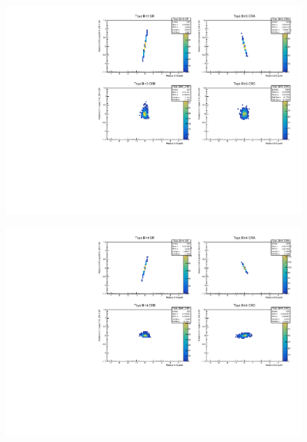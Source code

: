 \begin{figure}[H]
\includegraphics[width=\textwidth]{plots/diffx/instab/constfx/instabilities_mjj_QCD_Mgraph_Signal_Sh2211_BSDATASTATS_madgraphasimov_bin3.pdf}
\end{figure}
\begin{figure}[H]
\includegraphics[width=\textwidth]{plots/diffx/instab/constfx/instabilities_mjj_QCD_Mgraph_Signal_Sh2211_BSDATASTATS_madgraphasimov_bin4.pdf}
\end{figure}

